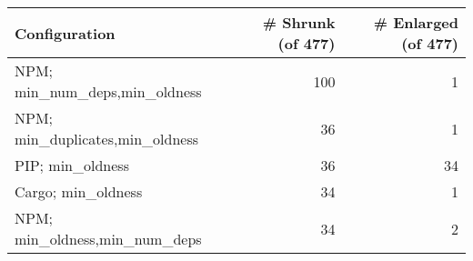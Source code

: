 \begin{table}[ht]
\centering
\begin{tabular}{lrr}
  \hline
Configuration & \# Shrunk (of 477) & \# Enlarged (of 477) \\ 
  \hline
NPM; min\_num\_deps,min\_oldness & 100 &   1 \\ 
  NPM; min\_duplicates,min\_oldness &  36 &   1 \\ 
  PIP; min\_oldness &  36 &  34 \\ 
  Cargo; min\_oldness &  34 &   1 \\ 
  NPM; min\_oldness,min\_num\_deps &  34 &   2 \\ 
   \hline
\end{tabular}
\end{table}
